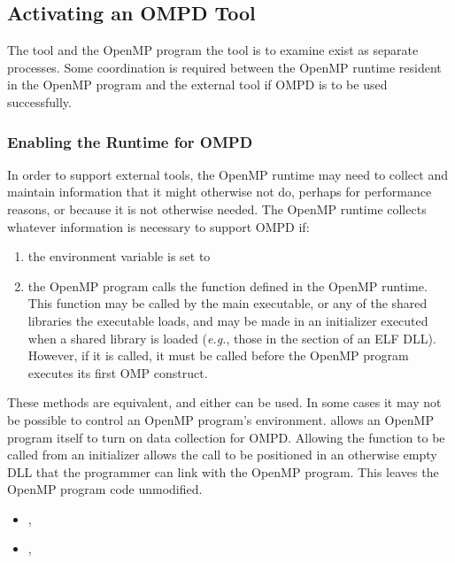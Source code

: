 \subsection{Activating an OMPD Tool}
\label{sec:ompd:activating}

The tool and the OpenMP program the tool is to examine
exist as separate processes.
Some coordination is required between the OpenMP runtime resident
in the OpenMP program and the external tool if OMPD is to be used
successfully.

\subsubsection{Enabling the Runtime for OMPD}
\label{sec:ompd:enabling-ompd}

In order to support external tools, the OpenMP runtime may need to collect
and maintain information that it might otherwise not do, perhaps
for performance reasons, or because it is not otherwise needed.
The OpenMP runtime collects whatever information is necessary
to support OMPD if:
\begin{enumerate}
\item
  the environment variable  is set to 
\item
  the OpenMP program calls the
  function defined in the OpenMP runtime.
  This function may be called by the main executable, or any of the
  shared libraries the executable loads, and may be made in an
  initializer executed when a shared library is loaded
  (\textit{e.g.}, those in the  section of an ELF DLL).
  However, if it is called, it must be called before the OpenMP program
  executes its first OMP construct.
\end{enumerate}
These methods are equivalent, and either can be used.
In some cases it may not be possible to control an OpenMP program's
environment.
 allows an OpenMP program itself to turn on
data collection for OMPD.
Allowing the function to be called from an initializer allows
the call to be positioned in an otherwise empty DLL that the
programmer can link with the OpenMP program.
This leaves the OpenMP program code unmodified.

\crossreferences
\begin{itemize}
\item
  , 
\item
  , 
\end{itemize}

